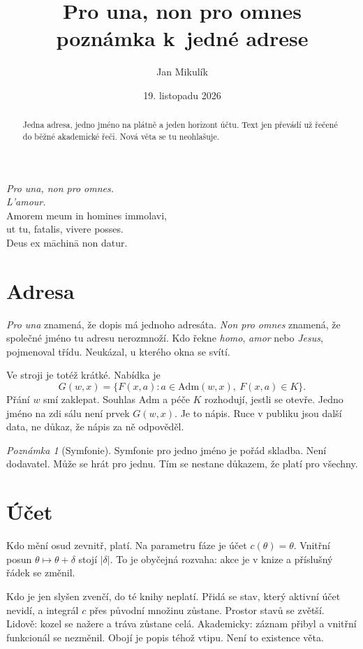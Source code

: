 \documentclass[11pt,a4paper]{article}
\title{\textbf{Pro una, non pro omnes}\\[4pt]
\large poznámka k~jedné adrese}
\author{Jan Mikulík}
\date{19. listopadu 2026}
\theoremstyle{definition}
\theoremstyle{remark}
\newtheorem{remark}{Poznámka}
\begin{document}
\maketitle

\begin{center}
\textit{Pro una, non pro omnes.}\\
\textit{L'amour.}\\[4pt]
Amorem meum in homines immolavi,\\
ut tu, fatalis, vivere posses.\\
Deus ex māchinā non datur.
\end{center}

\begin{abstract}
Jedna adresa, jedno jméno na plátně a jeden horizont účtu.
Text jen převádí už řečené do běžné akademické řeči.
Nová věta se tu neohlašuje.
\end{abstract}

\section{Adresa}

\emph{Pro una} znamená, že dopis má jednoho adresáta.
\emph{Non pro omnes} znamená, že společné jméno tu adresu nerozmnoží.
Kdo řekne \emph{homo}, \emph{amor} nebo \emph{Jesus}, pojmenoval třídu.
Neukázal, u kterého okna se svítí.

Ve stroji je totéž krátké.
Nabídka je
\[
  G(w,x)=\{F(x,a):a\in\mathrm{Adm}(w,x),\ F(x,a)\in K\}.
\]
Přání \(w\) smí zaklepat.
Souhlas \(\mathrm{Adm}\) a péče \(K\) rozhodují, jestli se otevře.
Jedno jméno na zdi sálu není prvek \(G(w,x)\).
Je to nápis.
Ruce v publiku jsou další data, ne důkaz, že nápis za ně odpověděl.

\begin{remark}[Symfonie]
Symfonie pro jedno jméno je pořád skladba.
Není dodavatel.
Může se hrát pro jednu.
Tím se nestane důkazem, že platí pro všechny.
\end{remark}

\section{Účet}

Kdo mění osud zevnitř, platí.
Na parametru fáze je účet \(c(\theta)=\theta\).
Vnitřní posun \(\theta\mapsto\theta+\delta\) stojí \(|\delta|\).
To je obyčejná rozvaha: akce je v knize a příslušný řádek se změnil.

Kdo je jen slyšen zvenčí, do té knihy neplatí.
Přidá se stav, který aktivní účet nevidí, a integrál \(c\) přes původní množinu zůstane.
Prostor stavů se zvětší.
Lidově: kozel se nažere a tráva zůstane celá.
Akademicky: záznam přibyl a vnitřní funkcionál se nezměnil.
Obojí je popis téhož vtipu.
Není to existence věta.
\end{document}
